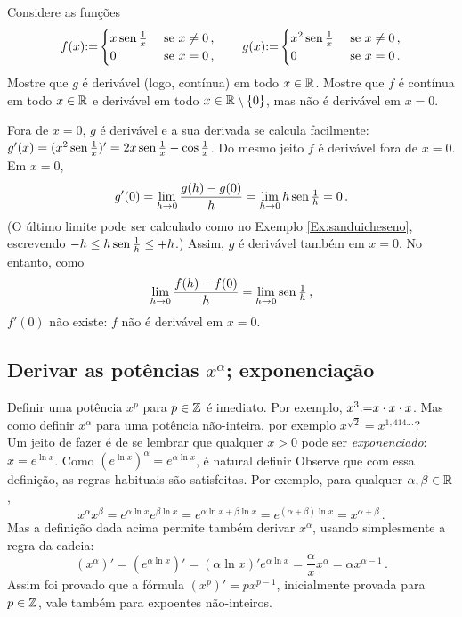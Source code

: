 \begin{exo}
Considere as funções 
$$
f(x){:=}
\begin{cases}
x\operatorname{sen} \frac1x &\text{ se } x\neq 0\,,\\
0  & \text{ se }x=0\,,
\end{cases}
\quad\quad
g(x){:=}
\begin{cases}
x^2\operatorname{sen} \frac1x &\text{ se } x\neq 0\,,\\
0  & \text{ se }x=0\,.
\end{cases}
$$
Mostre que $g$ é derivável (logo, contínua) em todo $x\in \mathbb{R}$.
Mostre que $f$ é contínua em todo $x\in \mathbb{R}$ e derivável em todo $x\in
\mathbb{R}\setminus\{0\}$, mas não é derivável em $x=0$.
\begin{sol}
Fora de $x=0$, $g$ é derivável e a sua derivada se calcula facilmente:
$g'(x)=(x^2\operatorname{sen} \frac1x)'=2x\operatorname{sen} \frac1x-\cos\frac1x$. 
Do mesmo jeito $f$ é derivável fora de $x=0$.
Em $x=0$, 
$$
g'(0)=\lim_{h\to 0}\frac{g(h)-g(0)}{h}=\lim_{h\to 0} h\operatorname{sen} \tfrac1h=0\,.
$$
(O último limite pode ser calculado como no Exemplo \ref{Ex:sanduicheseno},
escrevendo
$-h\leq h\operatorname{sen} \tfrac1h\leq +h$.)
Assim, $g$ é derivável também em $x=0$. No entanto, como
$$\lim_{h\to 0}\frac{f(h)-f(0)}{h}=\lim_{h\to 0} \operatorname{sen} \tfrac1h\,,$$
$f'(0)$ não existe: $f$ não é derivável em $x=0$.
\end{sol}
\end{exo}

\subsection{Derivar as potências $x^\alpha$; exponenciação}
Definir uma potência $x^p$ para $p\in \mathbb{Z}$ é imediato. Por exemplo,
$x^3{:=} x\cdot x\cdot x$. Mas como definir $x^\alpha$ para uma potência
não-inteira, por exemplo $x^{\sqrt{2}}=x^{1,414...}$? \\

Um jeito de fazer é de se lembrar que qualquer $x>0$ pode ser
\emph{exponenciado}: $x=e^{\ln x}$. Como $(e^{\ln x})^\alpha=e^{\alpha \ln x}$,
é natural definir
Observe que com essa definição, as regras habituais são satisfeitas. Por
exemplo, para qualquer $\alpha, \beta\in \mathbb{R}$,
$$
x^\alpha x^\beta=e^{\alpha \ln x}e^{\beta \ln x}=e^{\alpha \ln x+\beta \ln x}
=e^{(\alpha+\beta)\ln x}=x^{\alpha+\beta}\,.
$$
Mas a definição dada acima permite também derivar $x^\alpha$, usando
simplesmente a regra da cadeia:
$$(x^\alpha)'=(e^{\alpha \ln x})'=(\alpha \ln x)'e^{\alpha \ln
x}=\frac{\alpha}{x}x^\alpha=\alpha x^{\alpha-1}\,.$$
Assim foi provado que a fórmula $(x^p)'=px^{p-1}$, inicialmente provada para 
$p\in \mathbb{Z}$, vale também para expoentes não-inteiros.\\


